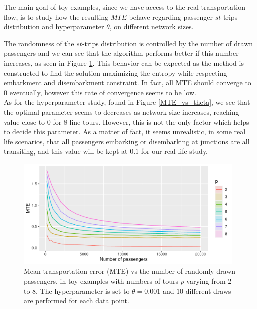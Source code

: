 \documentclass{bmcart}
\begin{document}
The main goal of toy examples, since we have access to the real transportation flow, is to study how the resulting $MTE$ behave regarding passenger $st$-trips distribution and hyperparameter $\theta$, on different network sizes. 

The randomness of the $st$-trips distribution is controlled by the number of drawn passengers and we can see that the algorithm performs better if this number increases, as seen in Figure \ref{MTE_vs_passengers}. This behavior can be expected as the method is constructed to find the solution maximizing the entropy while respecting embarkment and disembarkment constraint. In fact, all MTE should converge to $0$ eventually, however this rate of convergence seems to be low. \\
As for the hyperparameter study, found in Figure \ref{MTE_vs_theta}, we see that the optimal parameter seems to decreases as network size increases, reaching value close to $0$ for $8$ line tours. However, this is not the only factor which helps to decide this parameter. As a matter of fact, it seems unrealistic, in some real life scenarios, that all passengers embarking or disembarking at junctions are all transiting, and this value will be kept at $0.1$ for our real life study.

\begin{figure}
	\includegraphics[width=0.98\textwidth]{fig/MTE_passengers_theta01.pdf}
	\caption{Mean transportation error (MTE) vs the number of randomly drawn passengers, in toy examples with numbers of tours $p$ varying from 2 to 8. The hyperparameter is set to $\theta=0.001$ and $10$ different draws are performed for each data point.}
	\label{MTE_vs_passengers}
\end{figure}
\end{document}
